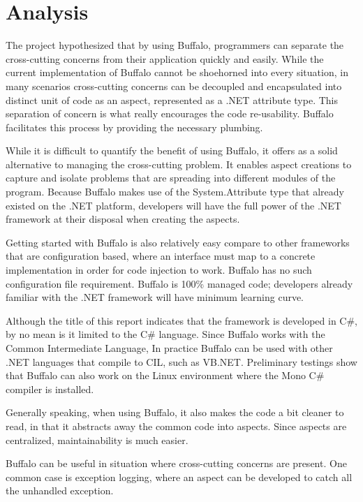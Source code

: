 \chapter{Analysis}

The project hypothesized that by using Buffalo, programmers can separate the cross-cutting concerns from their application quickly and easily. While the current implementation of Buffalo cannot be shoehorned into every situation, in many scenarios cross-cutting concerns can be decoupled and encapsulated into distinct unit of code as an aspect, represented as a .NET attribute type. This separation of concern is what really encourages the code re-usability. Buffalo facilitates this process by providing the necessary plumbing. 

While it is difficult to quantify the benefit of using Buffalo, it offers as a solid alternative to managing the cross-cutting problem. It enables aspect creations to capture and isolate problems that are spreading into different modules of the program. Because Buffalo makes use of the System.Attribute type that already existed on the .NET platform, developers will have the full power of the .NET framework at their disposal when creating the aspects. 

Getting started with Buffalo is also relatively easy compare to other frameworks that are configuration based, where an interface must map to a concrete implementation in order for code injection to work. Buffalo has no such configuration file requirement. Buffalo is 100\% managed code; developers already familiar with the .NET framework will have minimum learning curve.

Although the title of this report indicates that the framework is developed in C\#, by no mean is it limited to the C\# language. Since Buffalo works with the Common Intermediate Language, In practice Buffalo can be used with other .NET languages that compile to CIL, such as VB.NET. Preliminary testings show that Buffalo can also work on the Linux environment where the Mono C\# compiler is installed.

Generally speaking, when using Buffalo, it also makes the code a bit cleaner to read, in that it abstracts away the common code into aspects. Since aspects are centralized, maintainability is much easier. 

Buffalo can be useful in situation where cross-cutting concerns are present. One common case is exception logging, where an aspect can be developed to catch all the unhandled exception.

